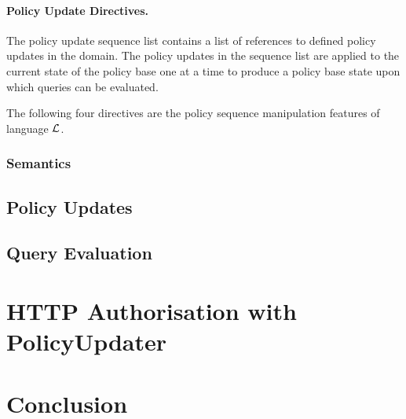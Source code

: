 \documentclass{llncs}
\begin{document}
        \paragraph{Policy Update Directives.}

        The policy update sequence list contains a list of references to
        defined policy updates in the domain. The policy updates in the
        sequence list are applied to the current state of the policy base one
        at a time to produce a policy base state upon which queries can be
        evaluated.

        The following four directives are the policy sequence manipulation
        features of language $\cal{L}$.

      \subsubsection{Semantics}

    \subsection{Policy Updates}

    \subsection{Query Evaluation}

  \section{HTTP Authorisation with PolicyUpdater}

  \section{Conclusion}

  \begin{thebibliography}{5}
  \end{thebibliography}
\end{document}
